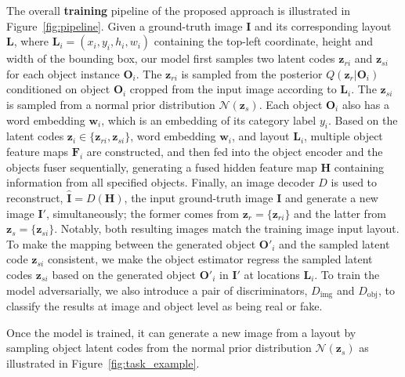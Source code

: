 \documentclass[10pt,twocolumn,letterpaper]{article}
\begin{document}
The overall {\bf training} pipeline of the proposed approach is illustrated in Figure~\ref{fig:pipeline}.
Given a ground-truth image $\mathbf{I}$ and its corresponding layout $\mathbf{L}$, where $\mathbf{L}_i = (x_i, y_i, h_i, w_i)$ containing the top-left  coordinate, height and width of the bounding box, our model first samples two latent codes $\mathbf{z}_{ri}$ and $\mathbf{z}_{si}$ for each object instance $\mathbf{O}_i$. 
The $\mathbf{z}_{ri}$ is sampled from the posterior $Q(\mathbf{z}_{r}|\mathbf{O}_i)$ conditioned on
object $\mathbf{O}_i$ cropped from the input image according to $\mathbf{L}_i$. The $\mathbf{z}_{si}$ is sampled from a normal prior distribution $\mathcal{N}(\mathbf{z}_{s})$.
Each object $\mathbf{O}_i$ also has a word embedding $\mathbf{w}_i$, which is an embedding of its category label $y_i$.
Based on the latent codes $\mathbf{z}_i \in \{ \mathbf{z}_{ri}, \mathbf{z}_{si} \}$, word embedding $\mathbf{w}_i$, and layout $\mathbf{L}_i$, multiple object feature maps $\mathbf{F}_i$ are constructed, and then fed into the object encoder and the objects fuser sequentially, generating a fused hidden feature map $\mathbf{H}$ containing information from all specified objects.
Finally, an image decoder $D$ is used to reconstruct, $\hat{\mathbf{I}} = D(\mathbf{H})$, the input ground-truth image $\mathbf{I}$ and generate a new image $\mathbf{I}'$, simultaneously; the former comes from $\mathbf{z}_{r} = \{ \mathbf{z}_{ri} \}$ and the latter from $\mathbf{z}_{s} = \{ \mathbf{z}_{si} \}$. Notably, both resulting images match the training image input layout.
To make the mapping between the generated object $\mathbf{O}'_i$ and the sampled latent code $\mathbf{z}_{si}$ consistent, we make the object estimator regress the sampled latent codes $\mathbf{z}_{si}$ based on the generated object $\mathbf{O}'_i$ in $\mathbf{I}'$ at locations $\mathbf{L}_i$.
To train the model adversarially, we also introduce a pair of discriminators, $D_\mathrm{img}$ and $D_\mathrm{obj}$, to classify the results at image and object level as being real or fake.





Once the model is trained, it can generate a new image from a layout by sampling object latent codes from the normal prior distribution $\mathcal{N}(\mathbf{z}_{s})$ as illustrated in Figure~\ref{fig:task_example}.
\end{document}
